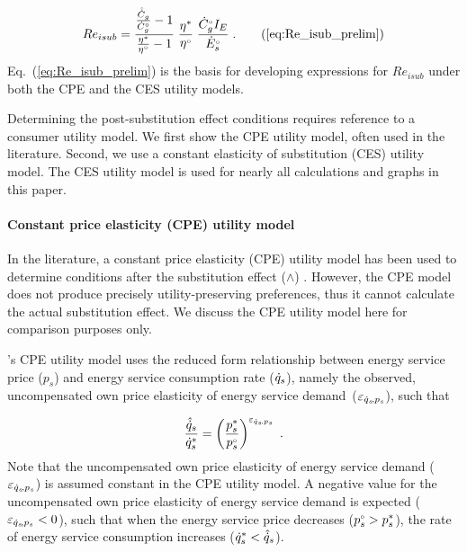 \begin{equation}
  Re_{isub} = \frac{\frac{\rasub{C}_g}{\rorig{C}_g} - 1}{\etaratiostacked - 1} \;
                          \etaratiostacked \;
                          \frac{\rbempl{C}_g I_E}{\rbempl{E}_s} \; .
                              \tag{\ref{eq:Re_isub_prelim}}
\end{equation}
%
Eq.~(\ref{eq:Re_isub_prelim}) is the basis for
developing expressions for $Re_{isub}$ under both the
CPE and the CES utility models.

Determining the post-substitution effect conditions
requires reference to a consumer utility model.
We first show the CPE utility model, often used in the literature.
Second, we use a constant elasticity of substitution (CES)
utility model.
The CES utility model is used for nearly all calculations and graphs
in this paper.


\paragraph{Constant price elasticity (CPE) utility model}
\label{sec:Resub_approximate_method}

In the literature, a constant price elasticity (CPE) utility model
has been used to determine
conditions after the substitution effect ($\wedge$)
\citep[p.~17, footnote~43]{Borenstein:2015aa}.
However, the CPE model does not produce precisely
utility-preserving preferences,
thus it cannot calculate the actual substitution effect.
We discuss the CPE utility model here for
comparison purposes only.

\citeauthor{Borenstein:2015aa}'s CPE utility model
uses the reduced form relationship between
energy service price ($p_s$) and
energy service consumption rate ($\dot{q}_s$),
namely the observed, uncompensated own price elasticity of energy service demand~($\varepsilon_{\dot{q}_s\!,p_s}$), such that

\begin{equation}
  \frac{\hat{\dot{q}}_s}{{\dot{q}}^*_s} = \left( \frac{{p}^*_s}{{}{p}^{\scriptscriptstyle \circ}_s} \right)^{\varepsilon_{\dot{q}_s\!,p_s}} \; .
\end{equation}
%
Note that the uncompensated own price elasticity
of energy service demand ($\varepsilon_{\dot{q}_s\!,p_s}$)
is assumed constant in the CPE utility model.
A negative value for the
uncompensated own price elasticity of energy service demand
is expected ($\varepsilon_{\dot{q}_s\!,p_s} < 0$),
such that when the energy service price decreases
(${}{p}^{\scriptscriptstyle \circ}_s > {p}^*_s $),
the rate of energy service consumption increases
(${\dot{q}}^*_s < \hat{\dot{q}}_s$).

